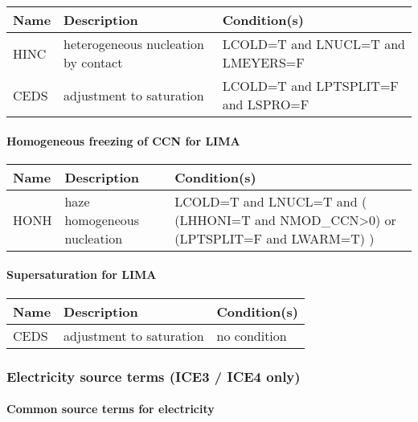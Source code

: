 \begin{longtable} {|p{}|p{}|p{}|}
\hline
Name & Description & Condition(s) \\
\hline \hline
\endhead
HINC   & heterogeneous nucleation by contact & LCOLD=T and LNUCL=T and LMEYERS=F \\\hline
CEDS   & adjustment to saturation            & LCOLD=T and LPTSPLIT=F and LSPRO=F \\\hline
\end{longtable}

\paragraph{Homogeneous freezing of CCN for LIMA}
\mbox{} %

\begin{longtable} {|p{}|p{}|p{}|}
\hline
Name & Description & Condition(s) \\
\hline \hline
\endhead
HONH   & haze homogeneous nucleation & LCOLD=T and LNUCL=T and ( (LHHONI=T and NMOD\_CCN>0) or (LPTSPLIT=F and LWARM=T) ) \\\hline
\end{longtable}

\paragraph{Supersaturation for LIMA}
\mbox{} %

\begin{longtable} {|p{}|p{}|p{}|}
\hline
Name & Description & Condition(s) \\
\hline \hline
\endhead
CEDS   & adjustment to saturation & no condition \\\hline
\end{longtable}


\subsubsection{Electricity source terms (ICE3 / ICE4 only)}

\paragraph{Common source terms for electricity}
\mbox{} %

